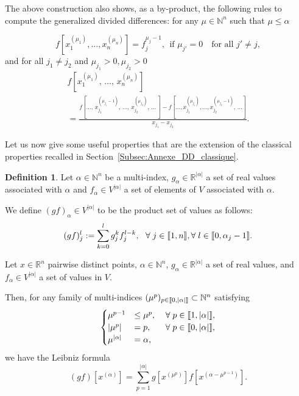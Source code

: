 \documentclass[10pt]{amsart}
\theoremstyle{definition}\newtheorem{defi}[theo]{Definition}\newtheorem{rema}[theo]{Remark}\newtheorem{exam}[theo]{Example}\newtheorem{exem}[theo]{Example}\newtheorem{nota}[theo]{Notation}
\newcommand{\llbracket}{\mathopen{[\mkern -2.7mu[}}
\newcommand{\rrbracket}{\mathclose{]\mkern -2.7mu]}}
\newcommand{\inter}[2]{\llbracket #1,#2 \rrbracket}
\newcommand{\N}{\mathbb{N}}
\newcommand{\R}{\mathbb{R}}
\let\oldforall\forall
\renewcommand*{\forall}{\mathrel{\oldforall}}
\begin{document}
The above construction also shows, as a by-product, the following rules to compute the generalized divided differences: for any $\mu\in \N^n$ such that $\mu\leq \alpha$

\begin{equation}\label{rule1}
f\left[x_1^{(\mu_1)},\dotsc,x_n^{(\mu_n)}\right] = f_j^{\mu_j-1}, \ \ \text{if }\mu_{j'}=0\quad\text{for all }j'\neq j,
\end{equation}
and for all $j_1\neq j_2$ and $\mu_{j_1}>0, \mu_{j_2}>0$
\begin{multline}\label{rule2}
f\left[x_1^{(\mu_1)}\!\!,\,\dotsc,\,x_n^{(\mu_n)}\right]\\
= \frac{f\left[\dotsc,\,x_{j_1}^{(\mu_{j_1}-1)}\!,\,\dotsc,\,x_{j_2}^{(\mu_{j_2})}\!,\,\dotsc\,\right] - f\left[\dotsc,x_{j_1}^{(\mu_{j_1})}\!,\dotsc,x_{j_2}^{(\mu_{j_2}-1)}\!,\,\dotsc\right]}{x_{j_1}-x_{j_2}}.
\end{multline}



Let us now give some useful properties that are the extension of the classical properties recalled in Section~\ref{Subsec:Annexe_DD_classique}.
\begin{defi}\label{Defi:produit_GDD}
Let $\alpha\in \N^n$ be a multi-index, $g_\alpha\in \R^{|\alpha|}$ a set of real values associated with $\alpha$ and $f_\alpha\in V^{|\alpha|}$ a set of elements of $V$ associated with $\alpha$.

We define $(gf)_\alpha\in V^{|\alpha|}$ to be the product set of values as follows:
\[
(gf)_j^l := \sum_{k=0}^l g_j^k f_j^{l-k}, \ \ \forall j\in \inter{1}{n}, \forall l\in \inter{0}{\alpha_j-1}.
\]
\end{defi}

\begin{prop}\label{Prop:GDD_Leibniz}
Let $x\in \R^n$ pairwise distinct points, $\alpha\in \N^n$, $g_\alpha\in \R^{|\alpha|}$ a set of real values, and $f_\alpha\in V^{|\alpha|}$ a set of values in $V$.

Then, for any family of multi-indices $(\mu^p)_{p\in \inter{0}{|\alpha|}} \subset \N^n $ satisfying
\begin{equation}\label{prop_muk}
\begin{cases}
\mu^{p-1}&\leq \mu^{p}, \mkern20mu \forall p\in\inter{1}{|\alpha|},\\
|\mu^p| &= p, \mkern30mu \forall p\in \inter{0}{|\alpha|},\\
\mu^{|\alpha|}&=\alpha,
\end{cases}
\end{equation}
we have the Leibniz formula
\[
(gf)\left[x^{(\alpha)}\right] = \sum_{p=1}^{|\alpha|} g\left[x^{(\mu^p)}\right] f\left[x^{(\alpha-\mu^{p-1})}\right].
\]
\end{prop}
\end{document}
